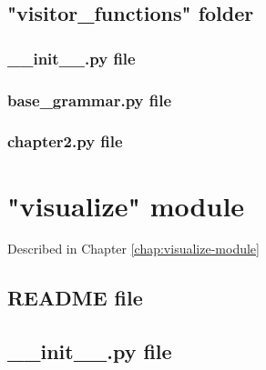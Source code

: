 

\section{"visitor\_functions" folder}

\subsection{\_\_init\_\_.py file}



\subsection{base\_grammar.py file}



\subsection{chapter2.py file}



\chapter{"visualize" module}
\label{appendix:visualize-annex}

Described in Chapter \ref{chap:visualize-module}

\section{README file}



\section{\_\_init\_\_.py file}

